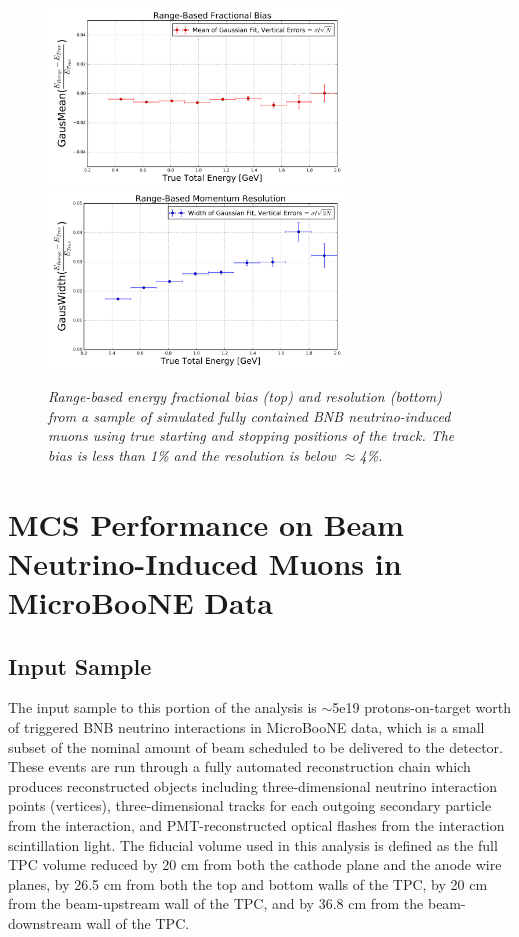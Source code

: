 \documentclass[a4paper,11pt]{article}
\begin{document}
\begin{figure}
\centering
\includegraphics[width=0.7\textwidth]
	{Figures/true_range_bias_MCBNBMCTrack.png}
\includegraphics[width=0.7\textwidth]
	{Figures/true_range_resolution_MCBNBMCTrack.png}
\caption{\textit{Range-based energy fractional bias (top) and resolution (bottom) from a sample of simulated fully contained BNB neutrino-induced muons using true starting and stopping positions of the track. The bias is less than 1\% and the resolution is below $\approx$4\%.}}
\label{true_range_bias_resolution_MCTrack_fig}
\end{figure}






\section{MCS Performance on Beam Neutrino-Induced Muons in MicroBooNE Data}\label{data_performance_section}

\subsection{Input Sample}
The input sample to this portion of the analysis is $\sim$5e19 protons-on-target worth of triggered BNB neutrino interactions in MicroBooNE data, which is a small subset of the nominal amount of beam scheduled to be delivered to the detector. These events are run through a fully automated reconstruction chain which produces reconstructed objects including three-dimensional neutrino interaction points (vertices), three-dimensional tracks for each outgoing secondary particle from the interaction, and PMT-reconstructed optical flashes from the interaction scintillation light. The fiducial volume used in this analysis is defined as the full TPC volume reduced by 20 cm from both the cathode plane and the anode wire planes, by 26.5 cm from both the top and bottom walls of the TPC, by 20 cm from the beam-upstream wall of the TPC, and by 36.8 cm from the beam-downstream wall of the TPC.
\end{document}
